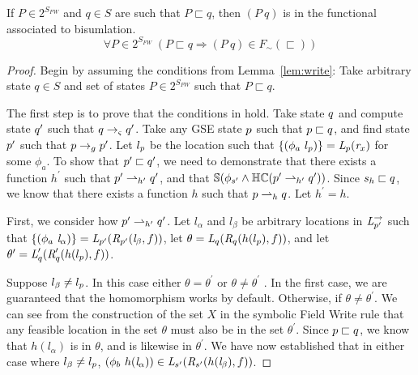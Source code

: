\begin{lemma}
If $P \in 2^{S_\mathit{FW}}$ and $q \in S$ are such that $P \sqsubset q$, then $(P\ q)$ is in the functional associated to bisumlation.
\label{lem:write}
$$
\forall P \in 2^{S_\mathit{FW}}\ (P \sqsubset q \Rightarrow (P\ q) \in F_\sim(\sqsubset))
$$
\end{lemma}



\begin{proof}
Begin by assuming the conditions from Lemma~\ref{lem:write}: Take arbitrary state $q \in S$ and set of states $P \in 2^{S_\mathit{FW}}$ such that $P \sqsubset q$.

The first step is to prove that the conditions in  hold. Take state $q$ and compute state $q^\prime$ such that $q \rightarrow_{\varsigma} q^\prime$. Take any GSE state $p$ such that $p \sqsubset q$, and find state $p^\prime$ such that $p \rightarrow_{g} p^\prime$. Let $l_{p}$ be the location such that $\{(\phi_a\ l_{p} )\} = \emph{L}_{p}(\emph{r}_x) $ for some $\phi_a$. To show that $p^\prime \sqsubset q^\prime$, we need to demonstrate that there exists a function $h^\prime$ such that $p^\prime \rightharpoonup_{h^\prime} q^\prime$, and that $\mathbb{S}(\phi_{s^\prime} \wedge \mathbb{HC}(p^\prime \rightharpoonup_{h^\prime} q^\prime) )$. Since $s_h \sqsubset q$, we know that there exists a function $h$ such that $p \rightharpoonup_{h} q$. Let $h^\prime = h$. 

First, we consider how $p^\prime \rightharpoonup_{h^\prime} q^\prime$. Let $l_\alpha$ and $l_\beta$ be arbitrary locations in $\emph{L}_{p^\prime}^\rightarrow$ such that $\{(\phi_a\ \emph{l}_\alpha)\} = \emph{L}_{p^\prime}(\emph{R}_{p^\prime}(\emph{l}_\beta,f ))$, let $\theta = \emph{L}_{q}(\emph{R}_{q}(h(l_{p}),f))$, and let $\theta^\prime =   \emph{L}_{q}^\prime(\emph{R}_{q}^\prime(h(l_{p}),f))$. 

Suppose $l_\beta \neq l_{p}$. In this case either $\theta = \theta^\prime$ or $\theta \neq \theta^\prime$ . In the first case, we are guaranteed that the homomorphism works by default. Otherwise, if $\theta \neq \theta^\prime$.  We can see from the construction of the set $X$ in the symbolic Field Write rule that any feasible location in the set $\theta$ must also be in the set $\theta^\prime$. Since $p \sqsubset q$, we know that $h(l_\alpha)$ is in $\theta$, and is likewise in $\theta^\prime$. We have now established that in either case where $l_\beta \neq l_{p}$, $(\phi_b\ h(\emph{l}_\alpha))\in \emph{L}_{s^\prime}(\emph{R}_{s^\prime} (h(\emph{l}_\beta),f ))$.


\end{proof}
